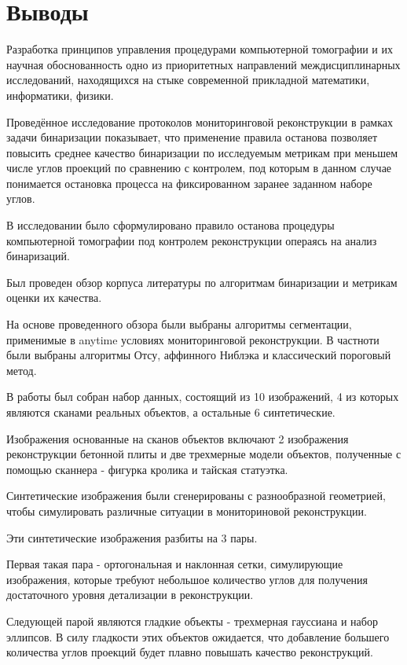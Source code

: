 \section{Выводы}

Разработка принципов управления процедурами компьютерной томографии и их научная обоснованность одно из приоритетных направлений междисциплинарных исследований, находящихся на стыке современной прикладной математики, информатики, физики.  

Проведённое исследование протоколов мониторинговой реконструкции в рамках задачи бинаризации показывает, что применение правила останова позволяет повысить среднее качество бинаризации по исследуемым метрикам при меньшем числе углов проекций по сравнению с контролем, под которым в данном случае понимается остановка процесса на фиксированном заранее заданном наборе углов.~

В исследовании было сформулировано правило останова процедуры компьютерной томографии под контролем реконструкции операясь на анализ бинаризаций. 

Был проведен обзор корпуса литературы по алгоритмам бинаризации и метрикам оценки их качества. 

На основе проведенного обзора были выбраны алгоритмы сегментации, применимые в anytime условиях мониторинговой реконструкции. В частноти были выбраны алгоритмы Отсу, аффинного Ниблэка и классический пороговый метод.

В работы был собран набор данных, состоящий из 10 изображений, 4 из которых являются сканами реальных объектов, а остальные 6 синтетические.

Изображения основанные на сканов объектов включают 2 изображения реконструкции бетонной плиты и две трехмерные модели объектов, полученные с помощью сканнера - фигурка кролика и тайская статуэтка.

Синтетические изображения были сгенерированы с разнообразной геометрией, чтобы симулировать различные ситуации в мониториновой реконструкции. 

Эти синтетические изображения разбиты на 3 пары. 

Первая такая пара - ортогональная и наклонная сетки, симулирующие изображения, которые требуют небольшое количество углов для получения достаточного уровня детализации в реконструкции.

Следующей парой являются гладкие объекты - трехмерная гауссиана и набор эллипсов. В силу гладкости этих объектов ожидается, что добавление большего количества углов проекций будет плавно повышать качество реконструкций.

